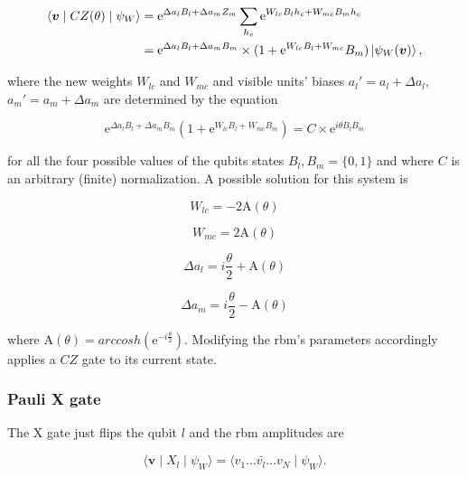 \begin{align}
    \langle \bm{v} \mid CZ(\theta) \mid \psi_{W}  \rangle &= 
    \mathrm{e}^{\Delta a_{l} B_{l} + \Delta a_{m} Z_{m}} \sum_{h_{c}}\mathrm{e}^{W_{lc} B_{l} h_{c} + W_{mc} B_{m} h_{c}} \\
    &= \mathrm{e}^{\Delta a_{l} B_{l} + \Delta a_{m} B_{m}} \times (1 + \mathrm{e}^{W_{lc} B_{l} + W_{mc}} B_{m}) \Ket{\psi_{W}(\bm{v})},
\end{align}

where the new weights $W_{lc}$ and $W_{mc}$ and visible units' biases $a_{l}\prime= a_{l} + \Delta a_{l}$,
$a_{m}\prime= a_{m} + \Delta a_{m}$ are determined by the equation

\begin{equation}
   \mathrm{e}^{\Delta a_{l} B_{l} + \Delta a_{m} B_{m}}(1 + \mathrm{e}^{W_{lc} B_{l} + W_{mc} B_{m}}) = C \times \mathrm{e}^{i \theta B_{l} B_{m}}
\end{equation}

for all the four possible values of the qubits states $B_{l}, B_{m} = \{0,1\}$ and where $C$ is an arbitrary (finite)
normalization. A possible solution for this system is

\begin{equation}
   W_{lc} = -2\mathrm{A}(\theta) 
\end{equation}

\begin{equation}
   W_{mc} = 2\mathrm{A}(\theta) 
\end{equation}

\begin{equation}
   \Delta a_{l} = i \frac{\theta}{2} + \mathrm{A}(\theta)
\end{equation}

\begin{equation}
   \Delta a_{m} = i \frac{\theta}{2} - \mathrm{A}(\theta)
\end{equation}

where $\mathrm{A}(\theta) = arccosh(\mathrm{e}^{-i \frac{\theta}{2}})$. Modifying the \gls{rbm}'s parameters 
accordingly applies a $CZ$ gate to its current state.

\subsubsection{Pauli X gate}
The X gate just flips the qubit $l$ and the \gls{rbm} amplitudes are

\begin{equation}
    \langle \bm{v} \mid X_{l} \mid \psi_{W}  \rangle = 
    \langle v_{1} \dots \bar{v_{l}} \dots v_{N} \mid \psi_{W} \rangle.
\end{equation}

